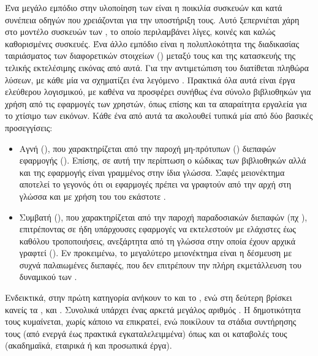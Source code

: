 Ένα μεγάλο εμπόδιο στην υλοποίηση των  είναι η ποικιλία συσκευών
και κατά συνέπεια οδηγών που χρειάζονται για την υποστήριξη τους. Αυτό
ξεπερνιέται χάρη στο μοντέλο συσκευών των , το οποίο
περιλαμβάνει λίγες, κοινές και καλώς καθορισμένες συσκευές. Ένα άλλο εμπόδιο
είναι η πολυπλοκότητα της διαδικασίας ταιριάσματος των διαφορετικών στοιχείων
() μεταξύ τους και της κατασκευής της τελικής εκτελέσιμης εικόνας
από αυτά. Για την αντιμετώπιση του διατίθεται πληθώρα λύσεων, με κάθε μία
να σχηματίζει ένα λεγόμενο . Πρακτικά όλα αυτά είναι
έργα ελεύθερου λογισμικού, με καθένα να προσφέρει συνήθως ένα σύνολο
βιβλιοθηκών για χρήση από τις εφαρμογές των χρηστών, όπως επίσης και τα
απαραίτητα εργαλεία για το χτίσιμο των εικόνων. Κάθε ένα από αυτά τα
 ακολουθεί τυπικά μία από δύο βασικές προσεγγίσεις:
\begin{itemize}
    \item Αγνή (), που χαρακτηρίζεται από την παροχή
        μη-πρότυπων () διεπαφών εφαρμογής (). Επίσης, σε
        αυτή την περίπτωση ο κώδικας των βιβλιοθηκών αλλά και της εφαρμογής
        είναι γραμμένος στην ίδια γλώσσα. Σαφές μειονέκτημα αποτελεί το γεγονός
        ότι οι εφαρμογές πρέπει να γραφτούν από την αρχή στη γλώσσα και με χρήση
        του  του εκάστοτε .
    \item Συμβατή (), που χαρακτηρίζεται από την παροχή
        παραδοσιακών διεπαφών (πχ ), επιτρέποντας σε ήδη υπάρχουσες
        εφαρμογές να εκτελεστούν με ελάχιστες έως καθόλου τροποποιήσεις,
        ανεξάρτητα από τη γλώσσα στην οποία έχουν αρχικά γραφτεί (). Εν προκειμένω, το μεγαλύτερο μειονέκτημα είναι η
        δέσμευση με συχνά παλαιωμένες διεπαφές, που δεν επιτρέπουν την πλήρη
        εκμετάλλευση του δυναμικού των .
\end{itemize}
Ενδεικτικά, στην πρώτη κατηγορία ανήκουν το  \cite{mirageos} και το
 \cite{includeos}, ενώ στη δεύτερη βρίσκει κανείς τα 
\cite{rumprun}, \osv{} \cite{osv} και  \cite{hermitux}. Συνολικά
υπάρχει ένας αρκετά μεγάλος αριθμός . Η δημοτικότητα
τους κυμαίνεται, χωρίς κάποιο να επικρατεί, ενώ ποικίλουν τα στάδια συντήρησης
τους (από ενεργά έως πρακτικά εγκαταλελειμμένα) όπως και οι καταβολές τους
(ακαδημαϊκά, εταιρικά ή και προσωπικά έργα).


